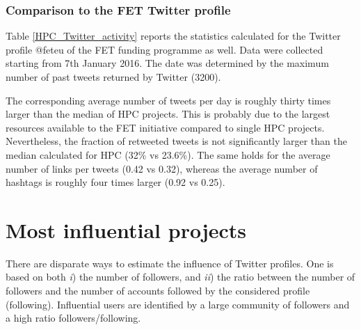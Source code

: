\subsubsection{Comparison to the FET Twitter profile}
Table \ref{HPC_Twitter_activity} reports the statistics calculated for the Twitter profile @fet\textunderscore eu of the FET funding programme as well. Data were collected starting from 7th January 2016. The date was determined by the maximum number of past tweets returned by Twitter (3200). 

The corresponding average number of tweets per day is roughly thirty times larger than the median of HPC projects. This is probably due to the largest resources available to the FET initiative compared to single HPC projects. Nevertheless, the fraction of retweeted tweets is not significantly larger than the median calculated for HPC (32\% vs 23.6\%). The same holds for the average number of links per tweets (0.42 vs 0.32), whereas the average number of hashtags is roughly four times larger (0.92 vs 0.25).

\section{Most influential projects} \label{Most_influential_projects}
There are disparate ways to estimate the influence of Twitter profiles. One is based on both \textit{i}) the number of followers, and \textit{ii}) the ratio between the number of followers and the number of accounts followed by the considered profile (following). Influential users are identified by a large community of followers and a high ratio followers/following.

